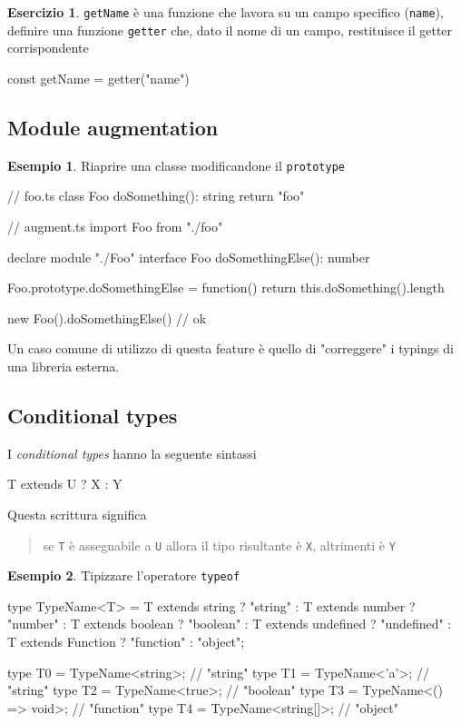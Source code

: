 \documentclass[12pt]{article}
\theoremstyle{definition}
\newtheorem{example}{Esempio}[subsection]
\newtheorem{exercise}{Esercizio}[subsection]
\newenvironment{code}
  {\vspace{0.5cm} \VerbatimEnvironment\begin{typescriptcode}}
  {\end{typescriptcode} \vspace{0.2cm}}
\begin{document}
\begin{exercise}
\texttt{getName} è una funzione che lavora su un campo specifico (\texttt{name}), definire
una funzione \texttt{getter} che, dato il nome di un campo, restituisce il getter corrispondente

\begin{code}
const getName = getter("name")
\end{code}
\end{exercise}

\subsection{Module augmentation}

\begin{example}
Riaprire una classe modificandone il \texttt{prototype}

\begin{code}
// foo.ts
class Foo {
  doSomething(): string {
    return "foo"
  }
}

// augment.ts
import { Foo } from "./foo"

declare module "./Foo" {
  interface Foo {
    doSomethingElse(): number
  }
}

Foo.prototype.doSomethingElse = function() {
  return this.doSomething().length
}

new Foo().doSomethingElse() // ok
\end{code}
\end{example}

Un caso comune di utilizzo di questa feature è quello di "correggere" i typings di una libreria esterna.

\subsection{Conditional types}

I \emph{conditional types} hanno la seguente sintassi

\begin{code}
T extends U ? X : Y
\end{code}

Questa scrittura significa

\begin{quote}
se \texttt{T} è assegnabile a \texttt{U} allora il tipo risultante è \texttt{X}, altrimenti è \texttt{Y}
\end{quote}

\begin{example}
Tipizzare l'operatore \texttt{typeof}

\begin{code}
type TypeName<T> =
    T extends string ? "string" :
    T extends number ? "number" :
    T extends boolean ? "boolean" :
    T extends undefined ? "undefined" :
    T extends Function ? "function" :
    "object";

type T0 = TypeName<string>;  // "string"
type T1 = TypeName<'a'>;  // "string"
type T2 = TypeName<true>;  // "boolean"
type T3 = TypeName<() => void>;  // "function"
type T4 = TypeName<string[]>;  // "object"
\end{code}
\end{example}
\end{document}
